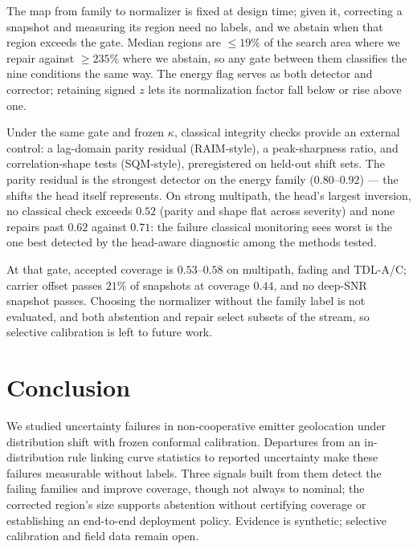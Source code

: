 \documentclass{article}
\begin{document}
The map from family to normalizer is fixed at design time; given it,
correcting a snapshot and measuring its region need no labels, and we
abstain when that region exceeds the gate. Median regions are $\le\!19\%$ of
the search area where we repair against $\ge\!235\%$ where we abstain, so any
gate between them classifies the nine conditions the same way. The energy flag serves as both detector and corrector; retaining signed
$z$ lets its normalization factor fall below or rise above one.

Under the same gate and frozen $\kappa$, classical integrity checks
provide an external control: a lag-domain parity residual (RAIM-style), a
peak-sharpness ratio, and correlation-shape tests (SQM-style),
preregistered on held-out shift sets. The parity residual is the strongest detector on the energy
family ($0.80$--$0.92$) --- the shifts the head itself represents. On
strong multipath, the head's largest inversion, no classical check
exceeds $0.52$ (parity and shape flat across severity) and none repairs
past $0.62$ against $0.71$: the
failure classical monitoring sees worst is the one best detected by the
head-aware diagnostic among the methods tested.

At that gate, accepted coverage is $0.53$--$0.58$ on multipath,
fading and TDL-A/C; carrier offset passes $21\%$ of snapshots at coverage
$0.44$, and no deep-SNR snapshot passes. Choosing the normalizer without
the family label is not evaluated, and both abstention and repair select
subsets of the stream, so selective calibration is left to future work.

\section{Conclusion}
\label{sec:concl}

We studied uncertainty failures in non-cooperative emitter geolocation
under distribution shift with frozen conformal calibration. Departures from
an in-distribution rule linking curve statistics to reported uncertainty
make these failures measurable without labels. Three signals built from
them detect the failing families and improve coverage, though not always to
nominal; the corrected region's size supports abstention without
certifying coverage or establishing an end-to-end deployment policy.
Evidence is synthetic; selective calibration and field data remain
open.

\vfill\pagebreak
\end{document}
